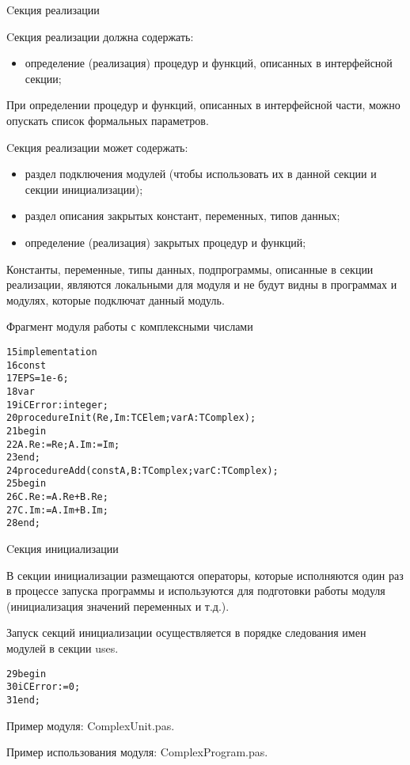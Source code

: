 \documentclass{beamer}
\begin{document}
\begin{frame}[fragile]{Cекция реализации}
\begin{block}{Cекция реализации должна содержать:}
\begin{itemize}
\item определение (реализация) процедур и функций, описанных в интерфейсной секции;
\end{itemize}
\end{block}
При определении процедур и функций, описанных в интерфейсной части, можно опускать список формальных параметров.
\begin{block}{Cекция реализации может содержать:}
\begin{itemize}
\item раздел подключения модулей (чтобы использовать их в данной секции и секции инициализации); 
\item раздел описания закрытых констант, переменных, типов данных;
\item определение (реализация) закрытых процедур и функций;
\end{itemize}
\end{block}
Константы, переменные, типы данных, подпрограммы, описанные в секции реализации,
являются локальными для модуля и не будут видны в программах и модулях, которые подключат данный модуль.
\end{frame}

\begin{frame}[fragile]{Фрагмент модуля работы с комплексными числами}
\begin{alltt}
15 implementation
16   const
17     EPS = 1e-6;
18   var
19     iCError: integer;
20   procedure Init(Re, Im: TСElem; var A: TComplex);
21	 begin
22      A.Re := Re; A.Im := Im;
23	 end;
24   procedure Add(const A, B: TComplex; var C: TComplex);
25   begin
26      C.Re := A.Re + B.Re;
27      C.Im := A.Im + B.Im;
28   end;
\end{alltt}
\end{frame} 

\begin{frame}[fragile]{Cекция инициализации}
\begin{block}{В секции инициализации}
размещаются операторы, которые исполняются один раз в процессе запуска программы и
используются для подготовки работы модуля (инициализация значений переменных и т.д.).
\end{block}
Запуск секций инициализации осуществляется в порядке следования имен модулей в секции uses.
\begin{alltt}
29 begin
30   iCError := 0;
31 end;
\end{alltt}
Пример модуля: ComplexUnit.pas.

Пример использования модуля: ComplexProgram.pas.
\end{frame}
\end{document}
